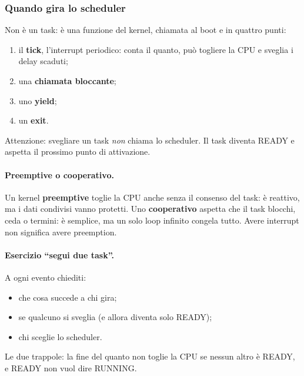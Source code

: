 \subsubsection*{Quando gira lo scheduler}
Non è un task: è una funzione del kernel, chiamata al boot e in quattro punti:

\begin{enumerate}
    \item il \textbf{tick}, l'interrupt periodico: conta il quanto, può togliere la CPU e sveglia i delay scaduti;
    \item una \textbf{chiamata bloccante};
    \item uno \textbf{yield};
    \item un \textbf{exit}.
\end{enumerate}
Attenzione: svegliare un task \emph{non} chiama lo scheduler. Il task diventa READY e aspetta il prossimo punto di attivazione.

\paragraph*{Preemptive o cooperativo.} Un kernel \textbf{preemptive} toglie la CPU anche senza il consenso del task: è reattivo, ma i dati condivisi vanno protetti. Uno \textbf{cooperativo} aspetta che il task blocchi, ceda o termini: è semplice, ma un solo loop infinito congela tutto. Avere interrupt non significa avere preemption.

\paragraph*{Esercizio ``segui due task''.} A ogni evento chiediti:
\begin{itemize}
    \item che cosa succede a chi gira;
    \item se qualcuno si sveglia (e allora diventa solo READY);
    \item chi sceglie lo scheduler.
\end{itemize}
Le due trappole: la fine del quanto non toglie la CPU se nessun altro è READY, e READY non vuol dire RUNNING.

